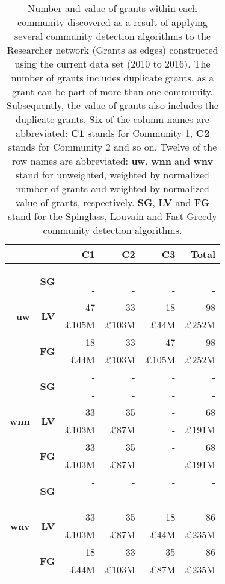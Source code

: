 \begin{table}[!htbp]
\centering
\caption[Number and value of grants within each community discovered in the Researcher network (Grants as edges) constructed using the current data set (2010 to 2016)]{Number and value of grants within each community discovered as a result of applying several community detection algorithms to the Researcher network (Grants as edges) constructed using the current data set (2010 to 2016). The number of grants includes duplicate grants, as a grant can be part of more than one community. Subsequently, the value of grants also includes the duplicate grants. Six of the column names are abbreviated: \textbf{C1} stands for Community 1, \textbf{C2} stands for Community 2 and so on. Twelve of the row names are abbreviated: \textbf{uw}, \textbf{wnn} and \textbf{wnv} stand for unweighted, weighted by normalized number of grants and weighted by normalized value of grants, respectively. \textbf{SG}, \textbf{LV} and \textbf{FG} stand for the Spinglass, Louvain and Fast Greedy community detection algorithms.}
\label{table:researcher_b_current_grants1_appendix}
\begin{tabular}{r|r|r|r|r|r}
\multicolumn{2}{c|}{} & \textbf{C1} & \textbf{C2} & \textbf{C3} & \textbf{Total}\\
\hline
\multirow{6}{*}{\textbf{uw}}
& \multirow{2}{*}{\textbf{SG}}
& {-} & {-} & {-} & {-}\\
& {} & {-} & {-} & {-} & {-}\\
\cline{2-6}
& \multirow{2}{*}{\textbf{LV}}
& {47} & {33} & {18} & {98}\\
& {} & {\pounds105M} & {\pounds103M} & {\pounds44M} & {\pounds252M}\\
\cline{2-6}
& \multirow{2}{*}{\textbf{FG}}
& {18} & {33} & {47} & {98}\\
& {} & {\pounds44M} & {\pounds103M} & {\pounds105M} & {\pounds252M}\\
\hline
\multirow{6}{*}{\textbf{wnn}}
& \multirow{2}{*}{\textbf{SG}}
& {-} & {-} & {-} & {-}\\
& {} & {-} & {-} & {-} & {-}\\
\cline{2-6}
& \multirow{2}{*}{\textbf{LV}}
& {33} & {35} & {-} & {68}\\
& {} & {\pounds103M} & {\pounds87M} & {-} & {\pounds191M}\\
\cline{2-6}
& \multirow{2}{*}{\textbf{FG}}
& {33} & {35} & {-} & {68}\\
& {} & {\pounds103M} & {\pounds87M} & {-} & {\pounds191M}\\
\hline
\multirow{6}{*}{\textbf{wnv}}
& \multirow{2}{*}{\textbf{SG}}
& {-} & {-} & {-} & {-}\\
& {} & {-} & {-} & {-} & {-}\\
\cline{2-6}
& \multirow{2}{*}{\textbf{LV}}
& {33} & {35} & {18} & {86}\\
& {} & {\pounds103M} & {\pounds87M} & {\pounds44M} & {\pounds235M}\\
\cline{2-6}
& \multirow{2}{*}{\textbf{FG}}
& {18} & {33} & {35} & {86}\\
& {} & {\pounds44M} & {\pounds103M} & {\pounds87M} & {\pounds235M}
\end{tabular}
\end{table}


